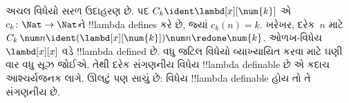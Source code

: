 \documentclass[../../../include/open-logic-section]{subfiles}
\begin{document}
અચલ વિધેયો સરળ ઉદાહરણ છે. પદ
$C_k \ident \lambd[x][\num{k}]$ એ
$c_k\colon \Nat \to \Nat$ને !!{lambda define}s
કરે છે, જ્યાં $c_k(n) = k$. ખરેખર, દરેક~$n$
માટે $C_k \, \num n \ident
(\lambd[x][\num{k}])\num n \redone \num{k}$.
ઓળખ-વિધેય $\lambd[x][x]$ વડે
!!{lambda defined} છે. વધુ જટિલ વિધેયો વ્યાખ્યાયિત
કરવા માટે ઘણી વાર વધુ સૂઝ જોઈએ. તેથી દરેક
સંગણનીય વિધેય !!{lambda definable} છે એ કદાચ
આશ્ચર્યજનક લાગે. ઊલટું પણ સાચું છે: વિધેય
!!{lambda definable} હોય તો તે સંગણનીય છે.
\end{document}
